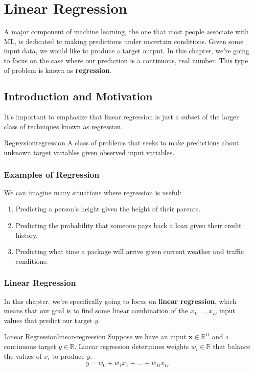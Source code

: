 \chapter{Linear Regression}
A major component of machine learning, the one that most people associate with ML, is dedicated to making predictions under uncertain conditions. Given some input data, we would like to produce a target output. In this chapter, we're going to focus on the case where our prediction is a continuous, real number. This type of problem is known as \textbf{regression}.

\section{Introduction and Motivation}
It's important to emphasize that linear regression is just a subset of the larger class of techniques known as regression.

\begin{definition}{Regression}{regression}
A class of problems that seeks to make predictions about unknown target variables given observed input variables.
\end{definition}

\subsection{Examples of Regression}
We can imagine many situations where regression is useful:
\begin{enumerate}
    \item Predicting a person's height given the height of their parents.
    \item Predicting the probability that someone pays back a loan given their credit history.
    \item Predicting what time a package will arrive given current weather and traffic conditions.
\end{enumerate}

\subsection{Linear Regression}
In this chapter, we're specifically going to focus on \textbf{linear regression}, which means that our goal is to find some linear combination of the $x_{1}, ..., x_{D}$ input values that predict our target $y$.

\begin{definition}{Linear Regression}{linear-regression}
Suppose we have an input $\textbf{x}\in\mathbb{R}^D$ and a continuous target $y\in\mathbb{R}$.
Linear regression determines weights $w_{i}\in\mathbb{R}$ that balance the values of $x_{i}$ to produce $y$:
\begin{equation}
    y = w_{0} + w_{1}x_{1} + ... + w_{D}x_{D}
\end{equation}

\end{definition}

